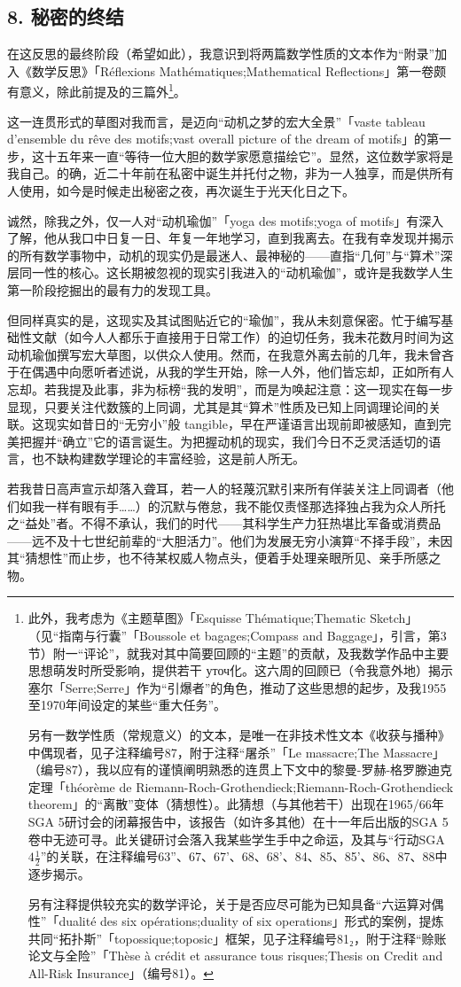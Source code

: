 \subsection{8. 秘密的终结}

在这反思的最终阶段（希望如此），我意识到将两篇数学性质的文本作为“附录”加入《数学反思》「Réflexions Mathématiques;Mathematical Reflections」第一卷颇有意义，除此前提及的三篇外\footnote{此外，我考虑为《主题草图》「Esquisse Thématique;Thematic Sketch」（见“指南与行囊”「Boussole et bagages;Compass and Baggage」，引言，第3节）附一“评论”，就我对其中简要回顾的“主题”的贡献，及我数学作品中主要思想萌发时所受影响，提供若干 уточ化。这六周的回顾已（令我意外地）揭示塞尔「Serre;Serre」作为“引爆者”的角色，推动了这些思想的起步，及我1955至1970年间设定的某些“重大任务”。

另有一数学性质（常规意义）的文本，是唯一在非技术性文本《收获与播种》中偶现者，见子注释编号87，附于注释“屠杀”「Le massacre;The Massacre」（编号87），我以应有的谨慎阐明熟悉的连贯上下文中的黎曼-罗赫-格罗滕迪克定理「théorème de Riemann-Roch-Grothendieck;Riemann-Roch-Grothendieck theorem」的“离散”变体（猜想性）。此猜想（与其他若干）出现在1965/66年SGA 5研讨会的闭幕报告中，该报告（如许多其他）在十一年后出版的SGA 5卷中无迹可寻。此关键研讨会落入我某些学生手中之命运，及其与“行动SGA $4 \frac{1}{2}$”的关联，在注释编号63''、67、67'、68、68'、84、85、85'、86、87、88中逐步揭示。

另有注释提供较充实的数学评论，关于是否应尽可能为已知具备“六运算对偶性”「dualité des six opérations;duality of six operations」形式的案例，提炼共同“拓扑斯”「topossique;toposic」框架，见子注释编号81₂，附于注释“赊账论文与全险”「Thèse à crédit et assurance tous risques;Thesis on Credit and All-Risk Insurance」（编号81）。}。

这一连贯形式的草图对我而言，是迈向“动机之梦的宏大全景”「vaste tableau d'ensemble du rêve des motifs;vast overall picture of the dream of motifs」的第一步，这十五年来一直“等待一位大胆的数学家愿意描绘它”。显然，这位数学家将是我自己。的确，近二十年前在私密中诞生并托付之物，非为一人独享，而是供所有人使用，如今是时候走出秘密之夜，再次诞生于光天化日之下。

诚然，除我之外，仅一人对“动机瑜伽”「yoga des motifs;yoga of motifs」有深入了解，他从我口中日复一日、年复一年地学习，直到我离去。在我有幸发现并揭示的所有数学事物中，动机的现实仍是最迷人、最神秘的——直指“几何”与“算术”深层同一性的核心。这长期被忽视的现实引我进入的“动机瑜伽”，或许是我数学人生第一阶段挖掘出的最有力的发现工具。

但同样真实的是，这现实及其试图贴近它的“瑜伽”，我从未刻意保密。忙于编写基础性文献（如今人人都乐于直接用于日常工作）的迫切任务，我未花数月时间为这动机瑜伽撰写宏大草图，以供众人使用。然而，在我意外离去前的几年，我未曾吝于在偶遇中向愿听者述说，从我的学生开始，除一人外，他们皆忘却，正如所有人忘却。若我提及此事，非为标榜“我的发明”，而是为唤起注意：这一现实在每一步显现，只要关注代数簇的上同调，尤其是其“算术”性质及已知上同调理论间的关联。这现实如昔日的“无穷小”般 tangible，早在严谨语言出现前即被感知，直到完美把握并“确立”它的语言诞生。为把握动机的现实，我们今日不乏灵活适切的语言，也不缺构建数学理论的丰富经验，这是前人所无。

若我昔日高声宣示却落入聋耳，若一人的轻蔑沉默引来所有佯装关注上同调者（他们如我一样有眼有手……）的沉默与倦怠，我不能仅责怪那选择独占我为众人所托之“益处”者。不得不承认，我们的时代——其科学生产力狂热堪比军备或消费品——远不及十七世纪前辈的“大胆活力”。他们为发展无穷小演算“不择手段”，未因其“猜想性”而止步，也不待某权威人物点头，便着手处理亲眼所见、亲手所感之物。